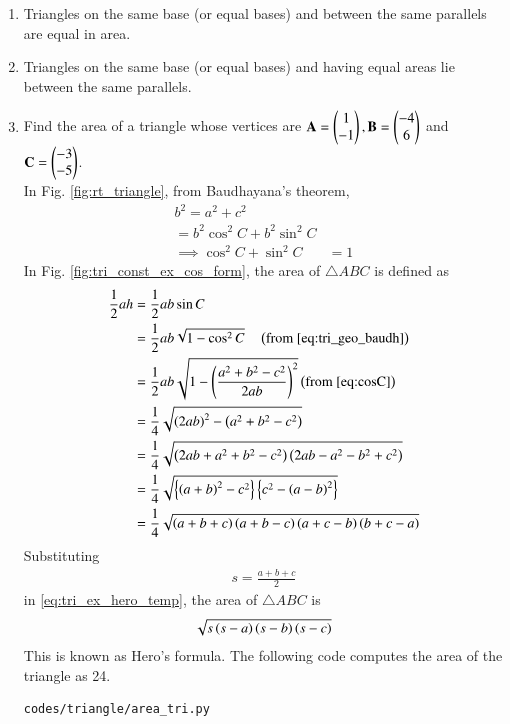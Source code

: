 \begin{enumerate}[label=\arabic*.,ref=\thesubsection.\theenumi]
\item Triangles on the same base (or equal bases) and between the same parallels are equal in area.
\item Triangles on the same base (or equal bases) and having equal areas lie between the same parallels.

\item Find the area of a triangle whose vertices are 
$\mathbf{A}=\begin{pmatrix}1\\-1\end{pmatrix}, 
\mathbf{B} = \begin{pmatrix}-4\\6\end{pmatrix}$ and
$ 
\mathbf{C} = \begin{pmatrix}-3\\-5\end{pmatrix}
$.
%
\\
\solution In Fig. \ref{fig:rt_triangle}, from Baudhayana's theorem, 
\begin{align}
\label{eq:tri_geo_baudh}
b^2 = a^2+c^2 &
\\
=b^2\cos^2C+b^2\sin^2C &
\\
\implies \cos^2C+\sin^2C &= 1
\end{align}
%
In Fig. \ref{fig:tri_const_ex_cos_form}, the area of $\triangle ABC$ is defined as
{\footnotesize
\begin{align}
\label{eq:tri_geo_area_sin_form}
\frac{1}{2}ah &= \frac{1}{2}ab\sin C
\\
&=\frac{1}{2}ab\sqrt{1-\cos^2C} \quad \left(\text{from } \eqref{eq:tri_geo_baudh}
\right)
\\
&=\frac{1}{2}ab\sqrt{1-\left(\frac{a^2+b^2-c^2}{2ab}\right)^2} \left(\text{from } \eqref{eq:cosC}
\right)
\\
&=\frac{1}{4}\sqrt{\left(2ab\right)^2-\left(a^2+b^2-c^2\right)}
\\
&=\frac{1}{4}\sqrt{\left(2ab+a^2+b^2-c^2\right)\left(2ab-a^2-b^2+c^2\right)}
\\
&= \frac{1}{4}\sqrt{\left\{\left(a+b\right)^2-c^2\right\}\left\{c^2-\left(a-b\right)^2\right\}}
\\
&= \frac{1}{4}\sqrt{\left(a+b+c\right)\left(a+b-c\right)\left(a+c-b\right)\left(b+c-a\right)}
\label{eq:tri_ex_hero_temp}
\end{align}
}
Substituting 
%
\begin{align}
s=\frac{a+b+c}{2}
\end{align}
%
in \eqref{eq:tri_ex_hero_temp}, the area of $\triangle ABC$ is 
%
\begin{align}
\label{eq:tri_hero}
\sqrt{s\left(s-a\right)\left(s-b\right)\left(s-c\right)}
\end{align}
%
This is known as Hero's formula.  The following code computes the area of the  triangle as 24.
%
\begin{lstlisting}
codes/triangle/area_tri.py
\end{lstlisting}

\end{enumerate}
